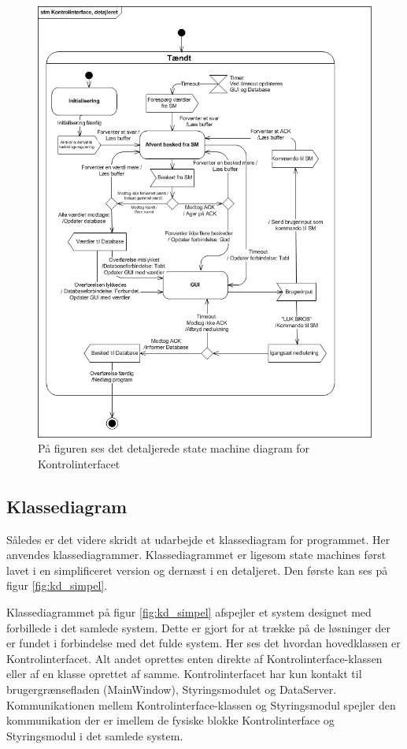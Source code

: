 \begin{figure}[htbp]
\centering
\label{fig:stm_detaljeret}
\includegraphics[width=.7\textwidth]{billeder/GUI/STM_KI_DETALJERET}
\caption{På figuren ses det detaljerede state machine diagram for Kontrolinterfacet}
\end{figure}

\subsection{Klassediagram}
Således er det videre skridt at udarbejde et klassediagram for programmet. Her anvendes klassediagrammer. Klassediagrammet er ligesom state machines først lavet i en simplificeret version og dernæst i en detaljeret. Den første kan ses på figur \ref{fig:kd_simpel}.

Klassediagrammet på figur \ref{fig:kd_simpel} afspejler et system designet med forbillede i det samlede system. Dette er gjort for at trække på de løsninger der er fundet i forbindelse med det fulde system. Her ses det hvordan hovedklassen er Kontrolinterfacet. Alt andet oprettes enten direkte af Kontrolinterface-klassen eller af en klasse oprettet af samme. Kontrolinterfacet har kun kontakt til brugergrænsefladen (MainWindow), Styringsmodulet og DataServer. Kommunikationen mellem Kontrolinterface-klassen og Styringsmodul spejler den kommunikation der er imellem de fysiske blokke Kontrolinterface og Styringsmodul i det samlede system.\\

